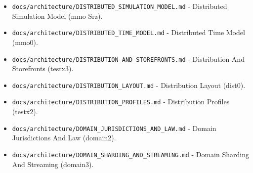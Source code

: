 \documentclass[9pt,a4paper,openany]{book}
\begin{document}
\begin{itemize}
\item \texttt{docs/\allowbreak{}architecture/\allowbreak{}DISTRIBUTED\_\allowbreak{}SIMULATION\_\allowbreak{}MODEL.\allowbreak{}md} -\allowbreak{} Distributed Simulation Model (mmo Srz).\allowbreak{}
\end{itemize}

\begin{itemize}
\item \texttt{docs/\allowbreak{}architecture/\allowbreak{}DISTRIBUTED\_\allowbreak{}TIME\_\allowbreak{}MODEL.\allowbreak{}md} -\allowbreak{} Distributed Time Model (mmo0).\allowbreak{}
\end{itemize}

\begin{itemize}
\item \texttt{docs/\allowbreak{}architecture/\allowbreak{}DISTRIBUTION\_\allowbreak{}AND\_\allowbreak{}STOREFRONTS.\allowbreak{}md} -\allowbreak{} Distribution And Storefronts (testx3).\allowbreak{}
\end{itemize}

\begin{itemize}
\item \texttt{docs/\allowbreak{}architecture/\allowbreak{}DISTRIBUTION\_\allowbreak{}LAYOUT.\allowbreak{}md} -\allowbreak{} Distribution Layout (dist0).\allowbreak{}
\end{itemize}

\begin{itemize}
\item \texttt{docs/\allowbreak{}architecture/\allowbreak{}DISTRIBUTION\_\allowbreak{}PROFILES.\allowbreak{}md} -\allowbreak{} Distribution Profiles (testx2).\allowbreak{}
\end{itemize}

\begin{itemize}
\item \texttt{docs/\allowbreak{}architecture/\allowbreak{}DOMAIN\_\allowbreak{}JURISDICTIONS\_\allowbreak{}AND\_\allowbreak{}LAW.\allowbreak{}md} -\allowbreak{} Domain Jurisdictions And Law (domain2).\allowbreak{}
\end{itemize}

\begin{itemize}
\item \texttt{docs/\allowbreak{}architecture/\allowbreak{}DOMAIN\_\allowbreak{}SHARDING\_\allowbreak{}AND\_\allowbreak{}STREAMING.\allowbreak{}md} -\allowbreak{} Domain Sharding And Streaming (domain3).\allowbreak{}
\end{itemize}
\end{document}
